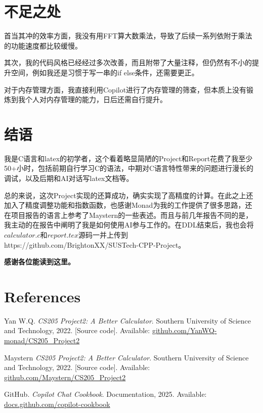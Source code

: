 \documentclass[11pt]{article}
\begin{document}
\section{不足之处}
首当其冲的效率方面，我没有用FFT算大数乘法，导致了后续一系列依附于乘法的功能速度都比较缓慢。


其次，我的代码风格已经经过多次改善，而且附带了大量注释，但仍然有不小的提升空间，例如我还是习惯于写一串的if else条件，还需要更正。


对于内存管理方面，我直接利用Copilot进行了内存管理的筛查，但本质上没有锻炼到我个人对内存管理的能力，日后还需自行提升。
\section{结语}
我是C语言和latex的初学者，这个看着略显简陋的Project和Report花费了我至少50+小时，包括前期自行学习C的语法，中期对C语言特性带来的问题进行漫长的调试，以及后期和AI对话写latex文档等。


总的来说，这次Project实现的还算成功，确实实现了高精度的计算。在此之上还加入了精度调整功能和指数函数，也感谢Monad为我的工作提供了很多思路，还在项目报告的语言上参考了Maystern的一些表述。而且与前几年报告不同的是，我主动的在报告中阐明了我是如何使用AI参与工作的。在DDL结束后，我也会将$calculator.c$和$report.tex$源码一并上传到https://github.com/BrightonXX/SUSTech-CPP-Project。


\textbf{感谢各位能读到这里。}
\section*{References}
\begin{thebibliography}{9}

Yan W.Q. \textit{CS205 Project2: A Better Calculator}. 
Southern University of Science and Technology, 2022. 
[Source code]. Available: 
\href{https://github.com/YanWQ-monad/SUSTech_CS205_Projects/tree/master/Project2_CalculatorEx}{github.com/YanWQ-monad/CS205\_Project2} 

Maystern \textit{CS205 Project2: A Better Calculator}. 
Southern University of Science and Technology, 2022. 
[Source code]. Available: 
\href{https://github.com/Maystern/SUSTech_CS205_Cpp_Projects/tree/main/Project02_a-better-calculator}{github.com/Maystern/CS205\_Project2} 

GitHub. \textit{Copilot Chat Cookbook}. 
Documentation, 2025. 
Available: 
\href{https://docs.github.com/en/copilot/copilot-chat-cookbook}{docs.github.com/copilot-cookbook} 

\end{thebibliography}
\end{document}
